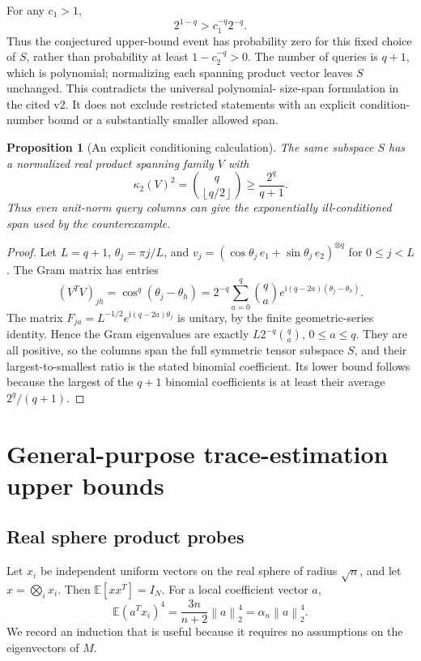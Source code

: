\documentclass[11pt]{article}
\newtheorem{proposition}[theorem]{Proposition}
\theoremstyle{definition}\newtheorem{definition}[theorem]{Definition}
\theoremstyle{remark}\newtheorem{remark}[theorem]{Remark}
\newcommand{\E}{\mathbb E}\newcommand{\PP}{\mathbb P}
\newcommand{\norm}[1]{\left\lVert#1\right\rVert}
\newcommand{\floor}[1]{\left\lfloor#1\right\rfloor}
\begin{document}
For any $c_1>1$,
\[
 2^{1-q}>c_1^{-q}2^{-q}.
\]
Thus the conjectured upper-bound event has probability zero for this fixed
choice of $S$, rather than probability at least $1-c_2^{-q}>0$.
The number of queries is $q+1$, which is polynomial; normalizing each spanning
product vector leaves $S$ unchanged. This contradicts the universal polynomial-
size-span formulation in the cited v2. It does not exclude restricted statements
with an explicit condition-number bound or a substantially smaller allowed span.


\begin{proposition}[An explicit conditioning calculation]\label{prop:conditioning}
The same subspace $S$ has a normalized real product spanning family $V$ with
\[
 \kappa_2(V)^2=\binom q{\floor{q/2}}\ge\frac{2^q}{q+1}.
\]
Thus even unit-norm query columns can give the exponentially ill-conditioned
span used by the counterexample.
\end{proposition}
\begin{proof}
Let $L=q+1$, $\theta_j=\pi j/L$, and
$v_j=(\cos\theta_j\,e_1+\sin\theta_j\,e_2)^{\otimes q}$ for $0\le j<L$.
The Gram matrix has entries
\[
 (V^TV)_{jh}=\cos^q(\theta_j-\theta_h)
 =2^{-q}\sum_{a=0}^q\binom qa
          e^{\mathrm{i}(q-2a)(\theta_j-\theta_h)}.
\]
The matrix $F_{ja}=L^{-1/2}e^{\mathrm{i}(q-2a)\theta_j}$ is unitary, by the
finite geometric-series identity. Hence the Gram eigenvalues are exactly
$L2^{-q}\binom qa$, $0\le a\le q$. They are all positive, so the columns span
the full symmetric tensor subspace $S$, and their largest-to-smallest ratio is
the stated binomial coefficient. Its lower bound follows because the largest
of the $q+1$ binomial coefficients is at least their average $2^q/(q+1)$.
\end{proof}

\section{General-purpose trace-estimation upper bounds}
\label{sec:upper}

\subsection{Real sphere product probes}
Let $x_i$ be independent uniform vectors on the real sphere of radius $\sqrt n$,
and let $x=\bigotimes_i x_i$. Then $\E[xx^T]=I_N$.
For a local coefficient vector $a$,
\[
 \E(a^Tx_i)^4=\frac{3n}{n+2}\norm a_2^4=\alpha_n\norm a_2^4.
\]
We record an induction that is useful because it requires no assumptions on the
eigenvectors of $M$.
\end{document}
